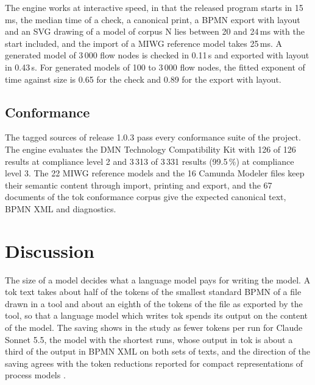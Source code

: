 \documentclass[11pt,a4paper]{article}
\begin{document}
The engine works at interactive speed, in that the released program starts in 15\,ms, the median time of a check, a canonical print, a BPMN export with layout and an SVG drawing of a model of corpus N lies between 20 and 24\,ms with the start included, and the import of a MIWG reference model takes 25\,ms. A generated model of 3\,000 flow nodes is checked in 0.11\,s and exported with layout in 0.43\,s. For generated models of 100 to 3\,000 flow nodes, the fitted exponent of time against size is 0.65 for the check and 0.89 for the export with layout.

\subsection{Conformance}

The tagged sources of release 1.0.3 pass every conformance suite of the project. The engine evaluates the DMN Technology Compatibility Kit with 126 of 126 results at compliance level 2 and 3\,313 of 3\,331 results (99.5\,\%) at compliance level 3. The 22 MIWG reference models and the 16 Camunda Modeler files keep their semantic content through import, printing and export, and the 67 documents of the tok conformance corpus give the expected canonical text, BPMN XML and diagnostics.

\section{Discussion}\label{sec:discussion}

The size of a model decides what a language model pays for writing the model. A tok text takes about half of the tokens of the smallest standard BPMN of a file drawn in a tool and about an eighth of the tokens of the file as exported by the tool, so that a language model which writes tok spends its output on the content of the model. The saving shows in the study as fewer tokens per run for Claude Sonnet 5.5, the model with the shortest runs, whose output in tok is about a third of the output in BPMN XML on both sets of texts, and the direction of the saving agrees with the token reductions reported for compact representations of process models \citep{Agrawal2026bpcf,Kopke2025efficient}.
\end{document}
